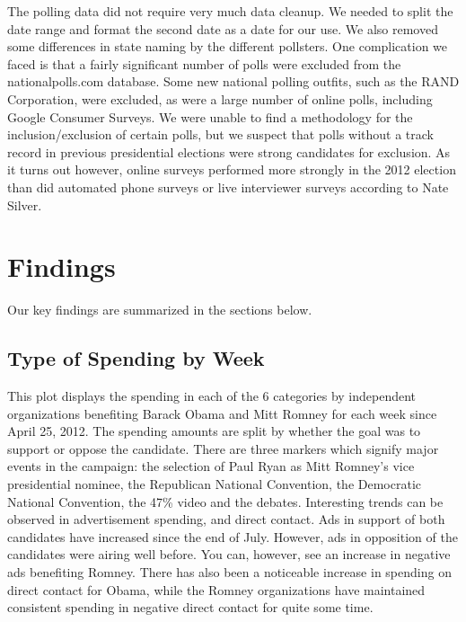 \documentclass[11pt]{article}\usepackage{graphicx, color}
\begin{document}
The polling data did not require very much data cleanup. We needed to split the date range and format the second date as a date for our use. We also removed some differences in state naming by the different pollsters.  One complication we faced is that a fairly significant number of polls were excluded from the nationalpolls.com database.  Some new national polling outfits, such as the RAND Corporation, were excluded, as were a large number of online polls, including Google Consumer Surveys.  We were unable to find a methodology for the inclusion/exclusion of certain polls, but we suspect that polls without a track record in previous presidential elections were strong candidates for exclusion.  As it turns out however, online surveys performed more strongly in the 2012 election than did automated phone surveys or live interviewer surveys according to Nate Silver.


\section{Findings}
Our key findings are summarized in the sections below.

\subsection{Type of Spending by Week}
This plot displays the spending in each of the 6 categories by independent organizations benefiting Barack Obama and Mitt Romney for each week since April 25, 2012. The spending amounts are split by whether the goal was to support or oppose the candidate. There are three markers which signify major events in the campaign: the selection of Paul Ryan as Mitt Romney's vice presidential nominee, the Republican National Convention, the Democratic National Convention, the 47\% video and the debates. 
Interesting trends can be observed in advertisement spending, and direct contact. Ads in support of both candidates have increased since the end of July. However, ads in opposition of the candidates were airing well before. You can, however, see an increase in negative ads benefiting Romney. There has also been a noticeable increase in spending on direct contact for Obama, while the Romney organizations have maintained consistent spending in negative direct contact for quite some time.
\end{document}
